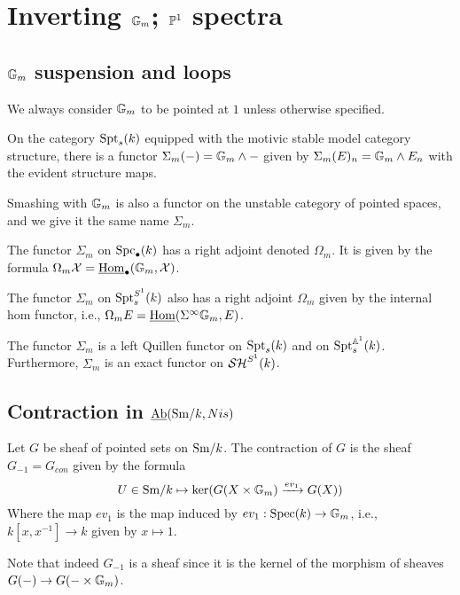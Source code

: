 \documentclass{amsart}%
\begin{document}
\section{Inverting $\mathbb{G}_m$; $\mathbb{P}^1$ spectra}

\subsection{$\mathbb{G}_m$ suspension and loops}

We always consider $\mathbb{G}_m$ to be pointed at $1$ unless otherwise
specified.

\begin{definition}
On the category $\mathrm{Spt}_s(k)$ equipped with the motivic stable model
category structure, there is a functor $\Sigma_m(-) = \mathbb{G}_m \wedge -$
given by $\Sigma_m(E)_n = \mathbb{G}_m \wedge E_n$ with the evident
structure maps.

Smashing with $\mathbb{G}_m$ is also a functor on the unstable category of
pointed spaces, and we give it the same name $\Sigma_m$.
\end{definition}

\begin{definition}
  The functor $\Sigma_m$ on $\mathrm{Spc}_{\bullet}(k)$ has a right adjoint
  denoted $\Omega_m$. It is given by the formula
  $\Omega_m\mathcal{X} = \underline{\operatorname{Hom}}_{\bullet}(\mathbb{G}_m,\mathcal{X})$.

  The functor $\Sigma_m$ on $\mathrm{Spt}_s^{S^1}(k)$ also has a right adjoint
  $\Omega_m$ given by the internal hom functor, i.e.,
  $\Omega_mE = \underline{\operatorname{Hom}}(\Sigma^{\infty}\mathbb{G}_{m}, E)$.
\end{definition}

\begin{proposition}
  The functor $\Sigma_m$ is a left Quillen functor on $\mathrm{Spt}_s(k)$ and
  on $\mathrm{Spt}_s^{\mathbb{A}^1}(k)$. Furthermore, $\Sigma_m$ is an exact functor
  on $\mathcal{SH}^{S^1}(k)$. 
\end{proposition}

\subsection{Contraction in $\operatorname{\underline{Ab}}(\mathrm{Sm}/k,Nis)$}

\begin{definition}
  Let $G$ be sheaf of pointed sets on $\mathrm{Sm}/k$. The contraction of $G$
  is the sheaf $G_{-1}=G_{con}$ given by the formula 
  \begin{equation*}
    U \in \mathrm{Sm}/k \mapsto \ker( G(X\times \mathbb{G}_m) \xrightarrow{ev_1} G(X))
  \end{equation*}
  Where the map $ev_1$ is the map induced by
  $ev_1 : \operatorname{Spec}(k) \to \mathbb{G}_m$, i.e., $k[x,x^{-1}] \to k$ given by
  $x\mapsto 1$. 

  Note that indeed $G_{-1}$ is a sheaf since it is the kernel of the
  morphism of sheaves $G(-) \to G(-\times \mathbb{G}_m)$. 
\end{definition}
\end{document}
